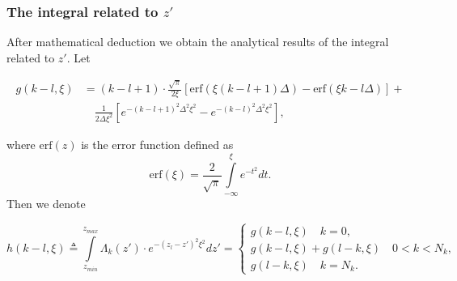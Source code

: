 \documentclass[preprint,12pt]{elsarticle}
\begin{document}
 \subsubsection{The integral related to $z'$}
 \label{integral_z_spatial}
 After mathematical deduction we obtain the analytical results of the integral related to $z'$. Let
 \begin{small}
 \begin{equation}
 \begin{split}
 g({k-l},\xi) &= ({k-l}+1)\cdot \frac{\sqrt{\pi}}{2\xi} \left[ \text{erf}(\xi ({k-l}+1)\Delta) - \text{erf}(\xi {k-l} \Delta) \right]  +  \\
& \quad  \frac{1}{2\Delta \xi^2} \left[ e^{-({k-l}+1)^2\Delta^2 \xi^2} - e^{-({k-l})^2\Delta^2 \xi^2} \right], 
\end{split}
 \end{equation}
 \end{small}
 where $\text{erf} (z)$ is the error function defined as \cite{M1972Handbook}
 \begin{equation}
 \text{erf}(\xi) = \frac{2}{\sqrt{\pi}} \int \limits^\xi_{-\infty} e^{-t^2} dt.
 \end{equation}
 Then we denote
 \begin{small}
 \begin{equation}
 h(k-l,\xi)  \triangleq \int \limits^{z_{max}}_{z_{min}} \Lambda_k(z') \cdot e^{-(z_l-z')^2\xi^2}dz' =
 \left\{ \begin{array}{ll}
 g(k-l,\xi) \quad k = 0, \\ 
 g(k-l,\xi) + g(l-k,\xi) \quad 0 < k < N_k, \\ 
 g(l-k,\xi) \quad k = N_k .
 \end{array}\right.
 \end{equation}
 \end{small}
\end{document}
